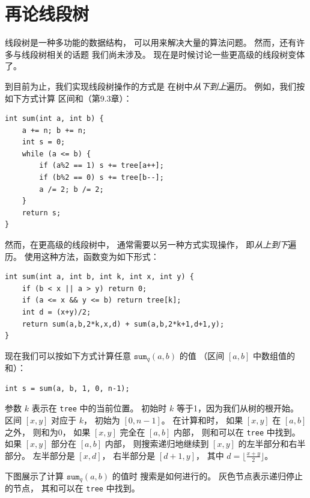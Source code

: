 \chapter{再论线段树}


线段树是一种多功能的数据结构，
可以用来解决大量的算法问题。
然而，还有许多与线段树相关的话题
我们尚未涉及。
现在是时候讨论一些更高级的线段树变体了。

到目前为止，我们实现线段树操作的方式是
在树中\emph{从下到上}遍历。
例如，我们按如下方式计算
区间和（第9.3章）：

\begin{lstlisting}
int sum(int a, int b) {
    a += n; b += n;
    int s = 0;
    while (a <= b) {
        if (a%2 == 1) s += tree[a++];
        if (b%2 == 0) s += tree[b--];
        a /= 2; b /= 2;
    }
    return s;
}
\end{lstlisting}

然而，在更高级的线段树中，
通常需要以另一种方式实现操作，
即\emph{从上到下}遍历。
使用这种方法，函数变为如下形式：
\begin{lstlisting}
int sum(int a, int b, int k, int x, int y) {
    if (b < x || a > y) return 0;
    if (a <= x && y <= b) return tree[k];
    int d = (x+y)/2;
    return sum(a,b,2*k,x,d) + sum(a,b,2*k+1,d+1,y);
}
\end{lstlisting}

现在我们可以按如下方式计算任意 $\texttt{sum}_q(a,b)$ 的值
（区间 $[a,b]$ 中数组值的和）：
\begin{lstlisting}
int s = sum(a, b, 1, 0, n-1);
\end{lstlisting}

参数 $k$ 表示在 \texttt{tree} 中的当前位置。
初始时 $k$ 等于1，因为我们从树的根开始。
区间 $[x,y]$ 对应于 $k$，
初始为 $[0,n-1]$。
在计算和时，
如果 $[x,y]$ 在 $[a,b]$ 之外，
则和为0，
如果 $[x,y]$ 完全在 $[a,b]$ 内部，
则和可以在 \texttt{tree} 中找到。
如果 $[x,y]$ 部分在 $[a,b]$ 内部，
则搜索递归地继续到
$[x,y]$ 的左半部分和右半部分。
左半部分是 $[x,d]$，
右半部分是 $[d+1,y]$，
其中 $d=\lfloor \frac{x+y}{2} \rfloor$。

下图展示了计算 $\texttt{sum}_q(a,b)$ 的值时
搜索是如何进行的。
灰色节点表示递归停止的节点，
其和可以在 \texttt{tree} 中找到。

